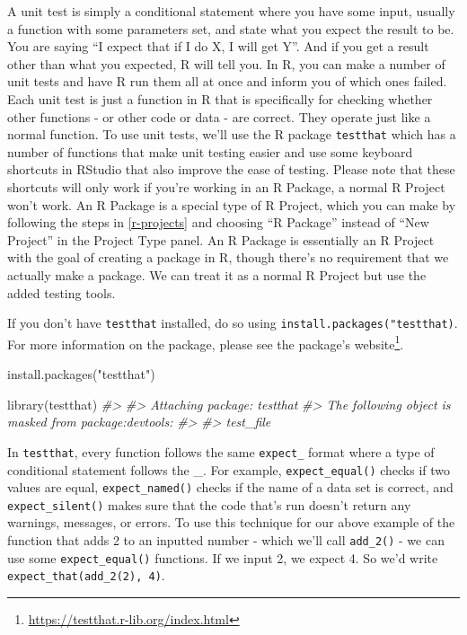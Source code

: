\documentclass[
]{krantz}
\makeatletter
\newenvironment{Shaded}{\begin{snugshade}}{\end{snugshade}}
\newcommand{\CommentTok}[1]{\textcolor[rgb]{0.37,0.37,0.37}{\textit{#1}}}
\newcommand{\FunctionTok}[1]{\textcolor[rgb]{0,0,0}{#1}}
\newcommand{\NormalTok}[1]{#1}
\newcommand{\StringTok}[1]{\textcolor[rgb]{0.5,0.5,0.5}{#1}}
\renewcommand{\href}[2]{#2\footnote{\url{#1}}}
\newenvironment{kframe}{%
\medskip{}
\setlength{\fboxsep}{.8em}
 \def\at@end@of@kframe{}%
 \ifinner\ifhmode%
  \def\at@end@of@kframe{\end{minipage}}%
  \begin{minipage}{\columnwidth}%
 \fi\fi%
 \def\FrameCommand##1{\hskip\@totalleftmargin \hskip-\fboxsep
 \colorbox{shadecolor}{##1}\hskip-\fboxsep
     \hskip-\linewidth \hskip-\@totalleftmargin \hskip\columnwidth}%
 \MakeFramed {\advance\hsize-\width
   \@totalleftmargin\z@ \linewidth\hsize
   \@setminipage}}%
 {\par\unskip\endMakeFramed%
 \at@end@of@kframe}
\renewenvironment{Shaded}{\begin{kframe}}{\end{kframe}}
\makeatother
\begin{document}
A unit test is simply a conditional statement where you have some input, usually a function with some parameters set, and state what you expect the result to be. You are saying ``I expect that if I do X, I will get Y''. And if you get a result other than what you expected, R will tell you. In R, you can make a number of unit tests and have R run them all at once and inform you of which ones failed. Each unit test is just a function in R that is specifically for checking whether other functions - or other code or data - are correct. They operate just like a normal function. To use unit tests, we'll use the R package \texttt{testthat} which has a number of functions that make unit testing easier and use some keyboard shortcuts in RStudio that also improve the ease of testing. Please note that these shortcuts will only work if you're working in an R Package, a normal R Project won't work. An R Package is a special type of R Project, which you can make by following the steps in \ref{r-projects} and choosing ``R Package'' instead of ``New Project'' in the Project Type panel. An R Package is essentially an R Project with the goal of creating a package in R, though there's no requirement that we actually make a package. We can treat it as a normal R Project but use the added testing tools.

If you don't have \texttt{testthat} installed, do so using \texttt{install.packages("testthat)}. For more information on the package, please see the package's \href{https://testthat.r-lib.org/index.html}{website}.

\begin{Shaded}
\begin{Highlighting}[]
\FunctionTok{install.packages}\NormalTok{(}\StringTok{"testthat"}\NormalTok{)}
\end{Highlighting}
\end{Shaded}

\begin{Shaded}
\begin{Highlighting}[]
\FunctionTok{library}\NormalTok{(testthat)}
\CommentTok{\#\textgreater{} }
\CommentTok{\#\textgreater{} Attaching package: \textquotesingle{}testthat\textquotesingle{}}
\CommentTok{\#\textgreater{} The following object is masked from \textquotesingle{}package:devtools\textquotesingle{}:}
\CommentTok{\#\textgreater{} }
\CommentTok{\#\textgreater{}     test\_file}
\end{Highlighting}
\end{Shaded}

In \texttt{testthat}, every function follows the same \texttt{expect\_} format where a type of conditional statement follows the \_. For example, \texttt{expect\_equal()} checks if two values are equal, \texttt{expect\_named()} checks if the name of a data set is correct, and \texttt{expect\_silent()} makes sure that the code that's run doesn't return any warnings, messages, or errors. To use this technique for our above example of the function that adds 2 to an inputted number - which we'll call \texttt{add\_2()} - we can use some \texttt{expect\_equal()} functions. If we input 2, we expect 4. So we'd write \texttt{expect\_that(add\_2(2),\ 4)}.
\end{document}
